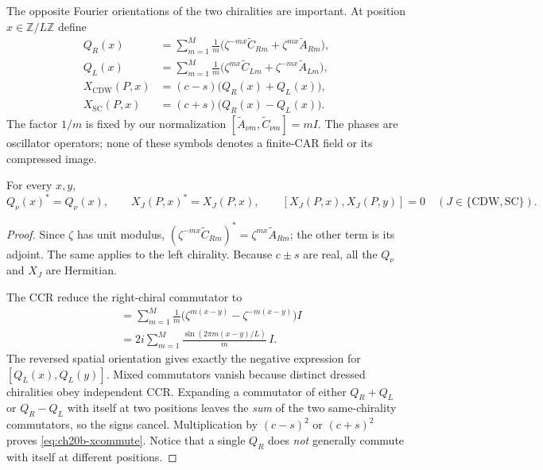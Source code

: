 The opposite Fourier orientations of the two chiralities are important.
At position \(x\in\mathbb Z/L\mathbb Z\) define
\begin{align}
 Q_R(x)&=\sum_{m=1}^M\frac{1}{m}
 \bigl(\zeta^{-mx}\widetilde C_{Rm}
       +\zeta^{mx}\widetilde A_{Rm}\bigr),
 \label{eq:ch20b-QR}\\
 Q_L(x)&=\sum_{m=1}^M\frac{1}{m}
 \bigl(\zeta^{mx}\widetilde C_{Lm}
       +\zeta^{-mx}\widetilde A_{Lm}\bigr),
 \label{eq:ch20b-QL}\\
 X_{\mathrm{CDW}}(P,x)&=(c-s)\bigl(Q_R(x)+Q_L(x)\bigr),
 \label{eq:ch20b-Xcdw}\\
 X_{\mathrm{SC}}(P,x)&=(c+s)\bigl(Q_R(x)-Q_L(x)\bigr).
 \label{eq:ch20b-Xsc}
\end{align}
The factor \(1/m\) is fixed by our normalization
\([\widetilde A_{\nu m},\widetilde C_{\nu m}]=mI\).
The phases are oscillator operators; none of these symbols denotes a
finite-CAR field or its compressed image.

\begin{lemma}
\label{lem:ch20b-hermitian-commuting}
For every \(x,y\),
\begin{equation}
 Q_\nu(x)^*=Q_\nu(x),\qquad
 X_J(P,x)^*=X_J(P,x),\qquad
 [X_J(P,x),X_J(P,y)]=0
 \quad(J\in\{\mathrm{CDW},\mathrm{SC}\}).
 \label{eq:ch20b-xcommute}
\end{equation}
\end{lemma}
\begin{proof}
Since \(\zeta\) has unit modulus,
\((\zeta^{-mx}\widetilde C_{Rm})^*
=\zeta^{mx}\widetilde A_{Rm}\); the other term is its adjoint.
The same applies to the left chirality.  Because \(c\pm s\) are real,
all the \(Q_\nu\) and \(X_J\) are Hermitian.

The CCR reduce the right-chiral commutator to
\begin{align*}
 [Q_R(x),Q_R(y)]
 &=\sum_{m=1}^M\frac1m
   \bigl(\zeta^{m(x-y)}-\zeta^{-m(x-y)}\bigr)I\\
 &=2i\sum_{m=1}^M\frac{\sin(2\pi m(x-y)/L)}m\,I.
\end{align*}
The reversed spatial orientation gives exactly the negative expression
for \([Q_L(x),Q_L(y)]\).  Mixed commutators vanish because distinct
dressed chiralities obey independent CCR.  Expanding a commutator of
either \(Q_R+Q_L\) or \(Q_R-Q_L\) with itself at two positions leaves
the \emph{sum} of the two same-chirality commutators, so the signs cancel.
Multiplication by \((c-s)^2\) or \((c+s)^2\) proves
\eqref{eq:ch20b-xcommute}.  Notice that a single \(Q_R\) does
\emph{not} generally commute with itself at different positions.
\end{proof}

